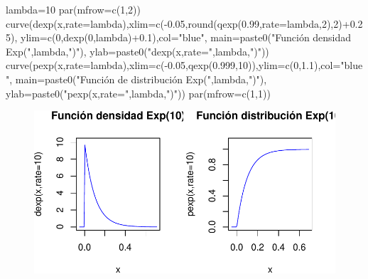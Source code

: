 \documentclass[
  letterpaper,
  DIV=11,
  numbers=noendperiod]{scrreprt}
\newenvironment{Shaded}{\begin{snugshade}}{\end{snugshade}}
\newcommand{\AttributeTok}[1]{\textcolor[rgb]{0.40,0.45,0.13}{#1}}
\newcommand{\DecValTok}[1]{\textcolor[rgb]{0.68,0.00,0.00}{#1}}
\newcommand{\FloatTok}[1]{\textcolor[rgb]{0.68,0.00,0.00}{#1}}
\newcommand{\FunctionTok}[1]{\textcolor[rgb]{0.28,0.35,0.67}{#1}}
\newcommand{\NormalTok}[1]{\textcolor[rgb]{0.00,0.23,0.31}{#1}}
\newcommand{\OtherTok}[1]{\textcolor[rgb]{0.00,0.23,0.31}{#1}}
\newcommand{\SpecialCharTok}[1]{\textcolor[rgb]{0.37,0.37,0.37}{#1}}
\newcommand{\StringTok}[1]{\textcolor[rgb]{0.13,0.47,0.30}{#1}}
\begin{document}
\begin{Shaded}
\begin{Highlighting}[]
\NormalTok{lambda}\OtherTok{=}\DecValTok{10}
\FunctionTok{par}\NormalTok{(}\AttributeTok{mfrow=}\FunctionTok{c}\NormalTok{(}\DecValTok{1}\NormalTok{,}\DecValTok{2}\NormalTok{))}
\FunctionTok{curve}\NormalTok{(}\FunctionTok{dexp}\NormalTok{(x,}\AttributeTok{rate=}\NormalTok{lambda),}\AttributeTok{xlim=}\FunctionTok{c}\NormalTok{(}\SpecialCharTok{{-}}\FloatTok{0.05}\NormalTok{,}\FunctionTok{round}\NormalTok{(}\FunctionTok{qexp}\NormalTok{(}\FloatTok{0.99}\NormalTok{,}\AttributeTok{rate=}\NormalTok{lambda,}\DecValTok{2}\NormalTok{),}\DecValTok{2}\NormalTok{)}\SpecialCharTok{+}\FloatTok{0.25}\NormalTok{),}
      \AttributeTok{ylim=}\FunctionTok{c}\NormalTok{(}\DecValTok{0}\NormalTok{,}\FunctionTok{dexp}\NormalTok{(}\DecValTok{0}\NormalTok{,lambda)}\SpecialCharTok{+}\FloatTok{0.1}\NormalTok{),}\AttributeTok{col=}\StringTok{"blue"}\NormalTok{,}
      \AttributeTok{main=}\FunctionTok{paste0}\NormalTok{(}\StringTok{"Función densidad Exp("}\NormalTok{,lambda,}\StringTok{")"}\NormalTok{),}
      \AttributeTok{ylab=}\FunctionTok{paste0}\NormalTok{(}\StringTok{"dexp(x,rate="}\NormalTok{,lambda,}\StringTok{")"}\NormalTok{))}
\FunctionTok{curve}\NormalTok{(}\FunctionTok{pexp}\NormalTok{(x,}\AttributeTok{rate=}\NormalTok{lambda),}\AttributeTok{xlim=}\FunctionTok{c}\NormalTok{(}\SpecialCharTok{{-}}\FloatTok{0.05}\NormalTok{,}\FunctionTok{qexp}\NormalTok{(}\FloatTok{0.999}\NormalTok{,}\DecValTok{10}\NormalTok{)),}\AttributeTok{ylim=}\FunctionTok{c}\NormalTok{(}\DecValTok{0}\NormalTok{,}\FloatTok{1.1}\NormalTok{),}\AttributeTok{col=}\StringTok{"blue"}\NormalTok{,}
      \AttributeTok{main=}\FunctionTok{paste0}\NormalTok{(}\StringTok{"Función de distribución Exp("}\NormalTok{,lambda,}\StringTok{")"}\NormalTok{),}
      \AttributeTok{ylab=}\FunctionTok{paste0}\NormalTok{(}\StringTok{"pexp(x,rate="}\NormalTok{,lambda,}\StringTok{")"}\NormalTok{))}
\FunctionTok{par}\NormalTok{(}\AttributeTok{mfrow=}\FunctionTok{c}\NormalTok{(}\DecValTok{1}\NormalTok{,}\DecValTok{1}\NormalTok{))}
\end{Highlighting}
\end{Shaded}

\begin{figure}

{\centering \includegraphics{3_files/figure-pdf/unnamed-chunk-76-1.pdf}

}

\end{figure}
\end{document}
